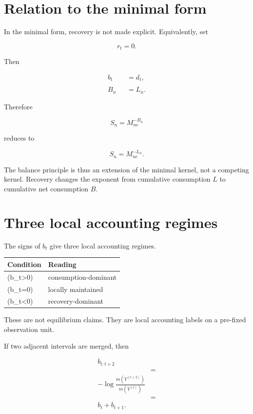 \documentclass[12pt,a4paper]{article}
\begin{document}
\section{Relation to the minimal form}\label{relation-to-the-minimal-form}

In the minimal form, recovery is not made explicit. Equivalently, set

\[
r_{t}=0.
\]

Then

\[
\begin{aligned}
b_{t}&=d_{t}, \\
\qquad \\
B_{n}&=L_{n}.
\end{aligned}
\]

Therefore

\[
S_{n}=M_{ne}^{-B_{n}}
\]

reduces to

\[
S_{n}=M_{ne}^{-L_{n}}.
\]

The balance principle is thus an extension of the minimal kernel, not a competing kernel. Recovery changes the exponent from cumulative consumption \(L\) to cumulative net consumption \(B\).

\section{Three local accounting regimes}\label{three-local-accounting-regimes}

The signs of \(b_{t}\) give three local accounting regimes.

{\def\LTcaptype{table} %
\begin{longtable}[]{@{}ll@{}}
\toprule\noalign{}
Condition & Reading \\
\midrule\noalign{}
\endhead
\bottomrule\noalign{}
\endlastfoot
(b\_t\textgreater0) & consumption-dominant \\
(b\_t=0) & locally maintained \\
(b\_t\textless0) & recovery-dominant \\
\end{longtable}
}

These are not equilibrium claims. They are local accounting labels on a pre-fixed observation unit.

If two adjacent intervals are merged, then

\[
\begin{aligned}
b_{t:t+2} \\
&= \\
-\log\frac{m(V^{(t+2)})}{m(V^{(t)})} \\
&= \\
b_{t}+b_{t+1}.
\end{aligned}
\]
\end{document}
